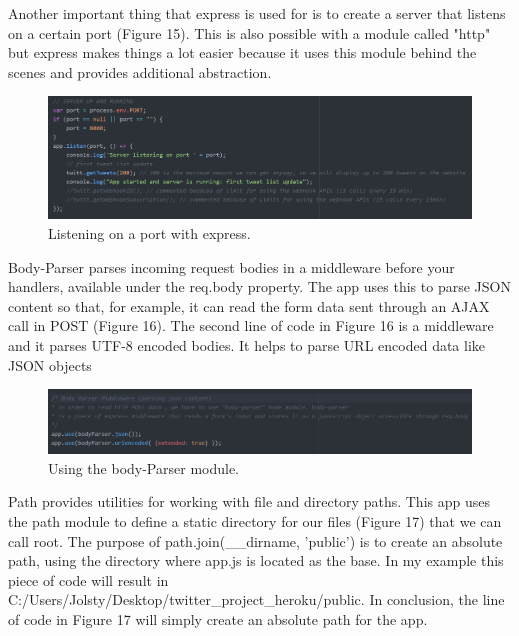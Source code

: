 \documentclass[12pt]{article} %
\begin{document}
	\noindent Another important thing that express is used for is to create a server that listens on a certain port (Figure 15).
	This is also possible with a module called "http" but express makes things a lot easier because it uses this module behind the scenes and provides additional abstraction.

	\begin{figure}[H] %
	\includegraphics[width=1\linewidth]{images/expresslisten}
	\caption{Listening on a port with express.}
	\label{expresslisten}
	\end{figure}
 
	\noindent Body-Parser \cite{body-parser} parses incoming request bodies in a middleware before your handlers, available under the req.body property.
	The app uses this to parse JSON content so that, for example, it can read the form data sent through an AJAX call in POST (Figure 16).
	The second line of code in Figure 16  is a middleware and it parses UTF-8 encoded bodies. It helps to parse URL encoded data like JSON objects

	\begin{figure}[H] %
	\includegraphics[width=1\linewidth]{images/bodyparser}
	\caption{Using the body-Parser module.}
	\label{bodyparser}
	\end{figure}

	\noindent Path \cite{path} provides utilities for working with file and directory paths. This app uses the path module to define a static directory for our files (Figure 17) that we can call root.
	The purpose of path.join(\_\_dirname, 'public') is to create an absolute path, using the directory where app.js is located as the base. In my example this piece of code will result in 
	C:/Users/Jolsty/Desktop/twitter\_project\_heroku/public. In conclusion, the line of code in Figure 17 will simply create an absolute path for the app.
\end{document}
